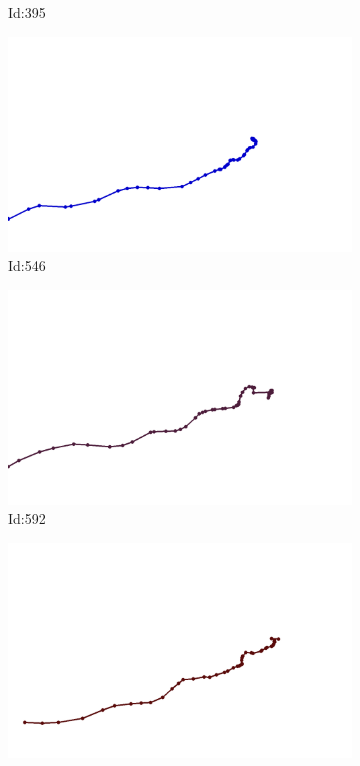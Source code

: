 \documentclass[12pt,twoside]{report}
\begin{document}
\begin{figure}
\begin{subfigure}[b]{0.20\textwidth}
\caption{Id:395}
\end{subfigure}
\begin{subfigure}[b]{0.20\textwidth}
\centering
\includegraphics[width=\textwidth]{../../trajectories/546.png}
\caption{Id:546}
\end{subfigure}
\begin{subfigure}[b]{0.20\textwidth}
\centering
\includegraphics[width=\textwidth]{../../trajectories/592.png}
\caption{Id:592}
\end{subfigure}
\begin{subfigure}[b]{0.20\textwidth}
\centering
\includegraphics[width=\textwidth]{../../trajectories/869.png}

\end{subfigure}
\end{figure}
\end{document}
